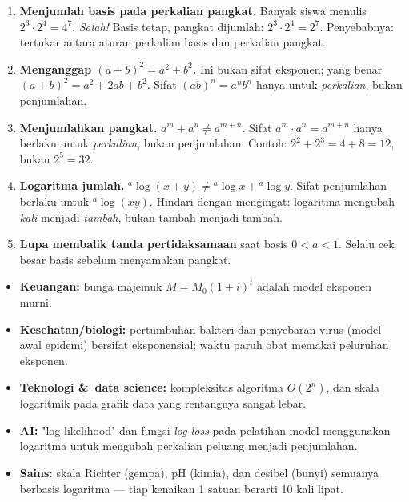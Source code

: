 \documentclass[11pt,a4paper]{report}
\theoremstyle{gaya}
\begin{document}
\begin{kesalahan}
\begin{enumerate}[leftmargin=*,topsep=2pt]
  \item \textbf{Menjumlah basis pada perkalian pangkat.} Banyak siswa menulis $2^3\cdot 2^4 = 4^7$. \emph{Salah!} Basis tetap, pangkat dijumlah: $2^3\cdot 2^4=2^7$. Penyebabnya: tertukar antara aturan perkalian basis dan perkalian pangkat.
  \item \textbf{Menganggap $(a+b)^2=a^2+b^2$.} Ini bukan sifat eksponen; yang benar $(a+b)^2=a^2+2ab+b^2$. Sifat $(ab)^n=a^nb^n$ hanya untuk \emph{perkalian}, bukan penjumlahan.
  \item \textbf{Menjumlahkan pangkat.} $a^m+a^n \neq a^{m+n}$. Sifat $a^m\cdot a^n = a^{m+n}$ hanya berlaku untuk \emph{perkalian}, bukan penjumlahan. Contoh: $2^2+2^3 = 4+8 = 12$, bukan $2^5=32$.
  \item \textbf{Logaritma jumlah.} ${}^{a}\!\log(x+y)\neq {}^{a}\!\log x+{}^{a}\!\log y$. Sifat penjumlahan berlaku untuk ${}^{a}\!\log(xy)$. Hindari dengan mengingat: logaritma mengubah \emph{kali} menjadi \emph{tambah}, bukan tambah menjadi tambah.
  \item \textbf{Lupa membalik tanda pertidaksamaan} saat basis $0<a<1$. Selalu cek besar basis sebelum menyamakan pangkat.
\end{enumerate}
\end{kesalahan}

\begin{dunianyata}
\begin{itemize}[leftmargin=*,topsep=2pt]
  \item \textbf{Keuangan:} bunga majemuk $M=M_0(1+i)^t$ adalah model eksponen murni.
  \item \textbf{Kesehatan/biologi:} pertumbuhan bakteri dan penyebaran virus (model awal epidemi) bersifat eksponensial; waktu paruh obat memakai peluruhan eksponen.
  \item \textbf{Teknologi \&\ data science:} kompleksitas algoritma $O(2^n)$, dan skala logaritmik pada grafik data yang rentangnya sangat lebar.
  \item \textbf{AI:} "log-likelihood" dan fungsi \emph{log-loss} pada pelatihan model menggunakan logaritma untuk mengubah perkalian peluang menjadi penjumlahan.
  \item \textbf{Sains:} skala Richter (gempa), pH (kimia), dan desibel (bunyi) semuanya berbasis logaritma --- tiap kenaikan 1 satuan berarti 10 kali lipat.
\end{itemize}
\end{dunianyata}
\end{document}
